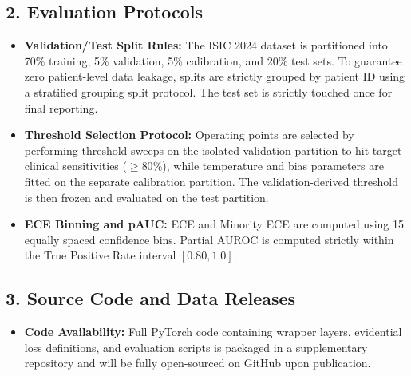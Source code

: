 \documentclass[letterpaper]{article} %
\begin{document}
\subsection*{2. Evaluation Protocols}
\begin{itemize}
    \item \textbf{Validation/Test Split Rules:} The ISIC 2024 dataset is partitioned into 70\% training, 5\% validation, 5\% calibration, and 20\% test sets. To guarantee zero patient-level data leakage, splits are strictly grouped by patient ID using a stratified grouping split protocol. The test set is strictly touched once for final reporting.
    \item \textbf{Threshold Selection Protocol:} Operating points are selected by performing threshold sweeps on the isolated validation partition to hit target clinical sensitivities ($\ge 80\%$), while temperature and bias parameters are fitted on the separate calibration partition. The validation-derived threshold is then frozen and evaluated on the test partition.
    \item \textbf{ECE Binning and pAUC:} ECE and Minority ECE are computed using 15 equally spaced confidence bins. Partial AUROC is computed strictly within the True Positive Rate interval $[0.80, 1.0]$.
\end{itemize}

\subsection*{3. Source Code and Data Releases}
\begin{itemize}
    \item \textbf{Code Availability:} Full PyTorch code containing wrapper layers, evidential loss definitions, and evaluation scripts is packaged in a supplementary repository and will be fully open-sourced on GitHub upon publication.
\end{itemize}
\end{document}
